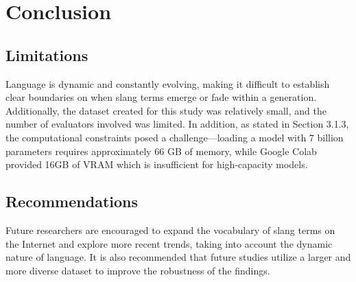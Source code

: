 \chapter{Conclusion}

\section{Limitations}
Language is dynamic and constantly evolving, making it difficult to establish clear boundaries on when slang terms emerge or fade within a generation. Additionally, the dataset created for this study was relatively small, and the number of evaluators involved was limited. In addition, as stated in Section 3.1.3, the computational constraints posed a challenge—loading a model with 7 billion parameters requires approximately 66 GB of memory, while Google Colab provided 16GB of VRAM which is insufficient for high-capacity models.

\section{Recommendations}
Future researchers are encouraged to expand the vocabulary of slang terms on the Internet and explore more recent trends, taking into account the dynamic nature of language. It is also recommended that future studies utilize a larger and more diverse dataset to improve the robustness of the findings.